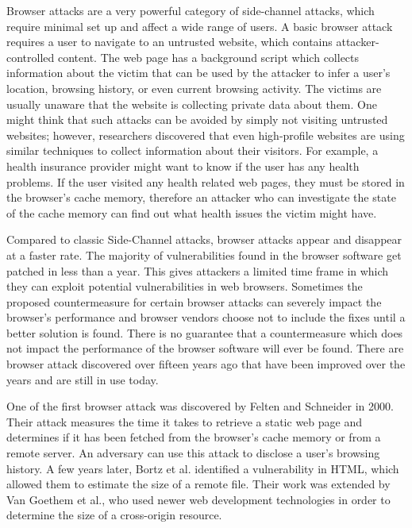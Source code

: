 \documentclass[a4paper,11pt]{article}
\begin{document}
Browser attacks are a very powerful category of side-channel attacks, which require minimal set up and affect a wide range of users. A basic browser attack requires a user to navigate to an untrusted website, which contains attacker-controlled content. The web page has a background script which collects information about the victim that can be used by the attacker to infer a user's location, browsing history, or even current browsing activity. The victims are usually unaware that the website is collecting private data about them. One might think that such attacks can be avoided by simply not visiting untrusted websites; however, researchers discovered that even high-profile websites are using similar techniques to collect information about their visitors\cite{jang2010empirical}. For example, a health insurance provider might want to know if the user has any health problems. If the user visited any health related web pages, they must be stored in the browser's cache memory, therefore an attacker who can investigate the state of the cache memory can find out what health issues the victim might have.

Compared to classic Side-Channel attacks, browser attacks appear and disappear at a faster rate. The majority of vulnerabilities found in the browser software get patched in less than a year. This gives attackers a limited time frame in which they can exploit potential vulnerabilities in web browsers. Sometimes the proposed countermeasure for certain browser attacks can severely impact the browser's performance and browser vendors choose not to include the fixes until a better solution is found. There is no guarantee that a countermeasure which does not impact the performance of the browser software will ever be found. There are browser attack discovered over fifteen years ago that have been improved over the years and are still in use today.

One of the first browser attack was discovered by Felten and Schneider\cite{felten2000timing} in 2000. Their attack measures the time it takes to retrieve a static web page and determines if it has been fetched from the browser's cache memory or from a remote server. An adversary can use this attack to disclose a user's browsing history. A few years later, Bortz et al.\cite{bortz2007exposing} identified a vulnerability in HTML, which allowed them to estimate the size of a remote file. Their work was extended by Van Goethem et al.\cite{van2015clock}, who used newer web development technologies in order to determine the size of a cross-origin resource.
 
\end{document}
